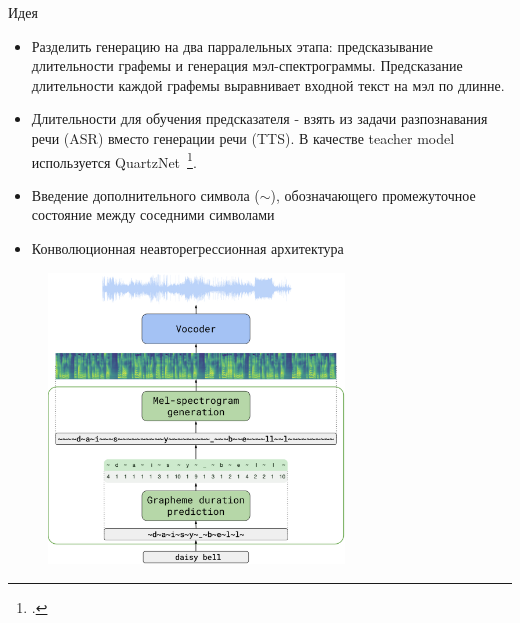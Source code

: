 \begin{frame}{Идея}
\begin{itemize}
    \item Разделить генерацию на два парралельных этапа: предсказывание длительности графемы и генерация мэл-спектрограммы. Предсказание длительности каждой графемы выравнивает входной текст на мэл по длинне.
    \item Длительности для обучения предсказателя - взять из задачи разпознавания речи (ASR) вместо генерации речи (TTS). В качестве teacher model используется QuartzNet~\footcite{quartznet}.
    \item Введение дополнительного символа ($\sim$), обозначающего промежуточное состояние между соседними символами
    \item Конволюционная неавторегрессионная архитектура
\end{itemize}
\end{frame}

\begin{frame}
\begin{figure}[H]
\centering
\includegraphics[width=0.7\textwidth]{images/arch.png}
\end{figure}
\end{frame}

